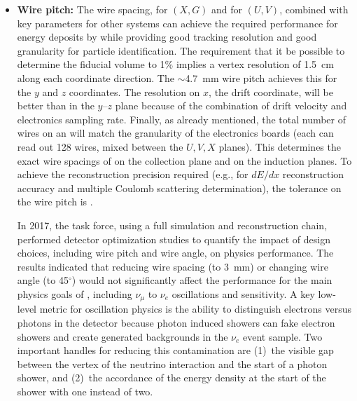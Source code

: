 \begin{itemize}
\item \textbf{Wire pitch:} The wire spacing, \xgpitch for $(X,G)$ and \uvpitch for $(U,V)$, combined with key parameters for other  systems %
can achieve the required performance for energy deposits by  while providing good tracking resolution and good granularity for particle identification. The \single requirement that it be possible to determine the fiducial volume to \num{1}\% implies a vertex resolution of \SI{1.5}{cm} along each coordinate direction. The $\sim$\SI{4.7}{mm} wire pitch achieves this for the $y$ and $z$ coordinates.  The resolution on $x$, the drift coordinate, will be better than in the $y$--$z$ plane because of the combination of drift velocity and electronics sampling rate.  Finally, as already mentioned, the total number of wires on an  will match the granularity of the electronics boards (each  can read out \num{128} wires, mixed between the $U,V,X$ planes). This determines the exact wire spacings of \xgpitch on the collection plane and \uvpitch on the induction planes.  To achieve the reconstruction precision required (e.g., for $dE/dx$ reconstruction accuracy and multiple Coulomb scattering determination), the tolerance on the wire pitch is \wirepitchtol.

In 2017, the   task force, using a full  simulation and reconstruction chain, performed detector optimization studies to quantify the impact of design choices, including wire pitch and wire angle, on  physics performance.  The results indicated that reducing wire spacing (to \SI{3}{mm}) or changing wire angle (to \num{45}$^\circ$) would not significantly affect the performance for the main physics goals of , including $\nu_\mu $ to $\nu_e$ oscillations and  sensitivity.  
A key low-level metric for oscillation physics is the ability to distinguish electrons versus photons in the detector because photon induced showers can fake electron showers and create  generated backgrounds in the $\nu_e$  event sample.  Two important handles for reducing this contamination are (1)~the visible gap between the vertex of the neutrino interaction and the start of a photon shower, and %
(2)~the accordance of the energy density at the start of the shower with one  instead of two.


\end{itemize}
